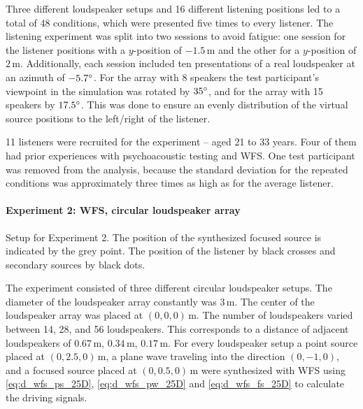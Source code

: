 Three different loudspeaker setups and 16 different listening positions
led to a total of 48 conditions, which were presented five times to every
listener. The listening experiment was split into two sessions to avoid fatigue:
one session for the listener positions with a $y$-position of $-1.5$\,m and
the other for a $y$-position of $2$\,m. Additionally, each session
included ten presentations of a real loudspeaker at an azimuth of
$-5.7^\circ$.
For the array with 8 speakers the test participant's viewpoint in the simulation
was rotated by $35^\circ$, and for the array with 15 speakers by $17.5^\circ$.
This was done to ensure
an evenly distribution of the virtual source positions to the left/right of the
listener.

11 listeners were recruited for the experiment -- aged 21 to 33 years.
Four of them had prior experiences with psychoacoustic testing and \ac{WFS}.
One test participant was removed from the analysis, because the standard
deviation for the repeated conditions was approximately three times as high as
for the average listener.


\paragraph{Experiment 2: \ac{WFS}, circular loudspeaker array}
\label{sec:experiment2_wfs_circular_array}
%
\begin{marginfigure}
    \ft
    
    \caption{Setup for Experiment 2. The position of the synthesized focused
    source is indicated by the grey point. The position of the listener by black
    crosses and secondary sources by black dots.
        }
    \label{fig:setup_wfs_circular_array}
\end{marginfigure}
%
The experiment consisted of three different circular loudspeaker setups. The
diameter of the loudspeaker array constantly was $3$\,m. The center of the
loudspeaker array was placed at $(0,0,0)$\,m. The number of loudspeakers
varied between 14, 28, and 56 loudspeakers. This corresponds to a distance
of adjacent loudspeakers of $0.67$\,m, $0.34$\,m, $0.17$\,m.
For every loudspeaker setup a point source placed at $(0,2.5,0)$\,m, a plane wave
traveling into the direction $(0,-1,0)$, and a focused source placed at $(0,0.5,0)$\,m
were synthesized with \ac{WFS} using \eqref{eq:d_wfs_ps_25D}, \eqref{eq:d_wfs_pw_25D}
and \eqref{eq:d_wfs_fs_25D} to calculate the driving signals.

